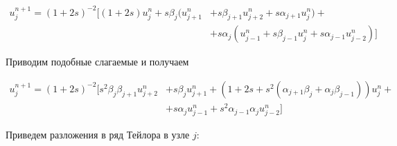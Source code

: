 \begin{equation} \label{alen-chen_united_1}
\begin{split}
	u_j^{n+1} = (1+2s)^{-2} \biggl[
	(1+2s)u_j^n + s \beta_j \biggl(
	u_{j+1}^n &+ s\beta_{j+1} u_{j+2}^n + s \alpha_{j+1} u_j^n \biggr) + \\
	&+ s \alpha_j \left( u_{j-1}^n + s \beta_{j-1} u_j^n + s \alpha_{j-1} u_{j-2}^n \right)
	\biggr]
\end{split}
\end{equation}

Приводим подобные слагаемые и получаем

\begin{equation} \label{alen-chen_united}
\begin{split}
	u_j^{n+1} = (1+2s)^{-2} \biggl[ s^2 \beta_j \beta_{j+1} u_{j+2}^n &+ s \beta_j u_{j+1}^n + \left( 1 + 2s + s^2 \left( \alpha_{j+1}\beta_j + \alpha_j \beta_{j-1} \right) \right) u_j^n + \\
	&+ s \alpha_j u_{j-1}^n + s^2 \alpha_{j-1} \alpha_j u_{j-2}^n \biggr]
\end{split}
\end{equation}

Приведем разложения в ряд Тейлора в узле $j$:

